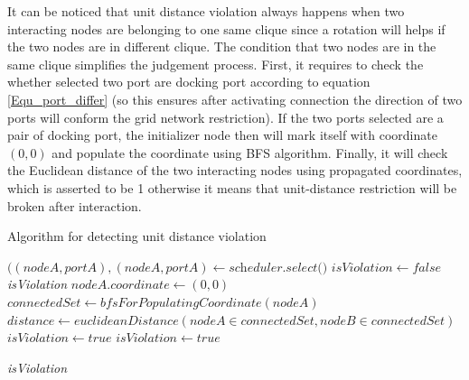 \par\noindent
It can be noticed that unit distance violation always happens when two interacting nodes are belonging to one
same clique since a rotation will helps if the two nodes are in different clique. The condition
that two nodes are in the same clique simplifies the judgement process. First, it requires to check the
whether selected two port are docking port according to equation \ref{Equ_port_differ} (so this ensures after activating connection the
direction of two ports will conform the grid network restriction). If the two ports selected are a pair of
docking port, the initializer node then will mark itself with coordinate $(0,0)$ and populate the coordinate using
BFS algorithm. Finally, it will check the Euclidean distance of the two interacting nodes using propagated coordinates,
which is asserted to be 1 otherwise it means that unit-distance restriction will be broken after interaction.

\begin{algorithm}
\caption{Algorithm for detecting unit distance violation}\label{algo_dudv}
\begin{algorithmic}[1]

\State $((\textit{nodeA},\textit{portA}), (\textit{nodeA}, \textit{portA}) \gets \textit{scheduler.select()}$
\State $\textit{isViolation} \gets false$
 \Return \textit{isViolation} \EndIf
{}
    \State $ nodeA.coordinate \gets (0,0) $
    \State $ connectedSet \gets bfsForPopulatingCoordinate(nodeA) $
    \State $ distance \gets euclideanDistance(nodeA \in connectedSet, nodeB \in connectedSet)$
     \State $\textit{isViolation} \gets true$ \EndIf
\Else
    \State $\textit{isViolation} \gets true$
\EndIf

\Return \textit{isViolation}

\EndProcedure
\end{algorithmic}
\end{algorithm}


